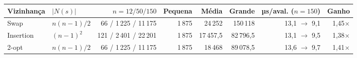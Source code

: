 \begin{tabular}{llrrrrrr}
\toprule
Vizinhança & $|N(s)|$ & $n = 12 / 50 / 150$ & Pequena & Média & Grande & µs/aval. ($n=150$) & Ganho \\
\midrule
Swap & $n(n-1)/2$ & 66 / 1\,225 / 11\,175 & 1\,875 & 24\,252 & 150\,118 & 13,1 $\to$ 9,1 & 1,45$\times$ \\
Insertion & $(n-1)^2$ & 121 / 2\,401 / 22\,201 & 1\,875 & 17\,457,5 & 82\,796,5 & 13,1 $\to$ 9,5 & 1,38$\times$ \\
2-opt & $n(n-1)/2$ & 66 / 1\,225 / 11\,175 & 1\,875 & 18\,468 & 89\,078,5 & 13,6 $\to$ 9,7 & 1,41$\times$ \\
\bottomrule
\end{tabular}
